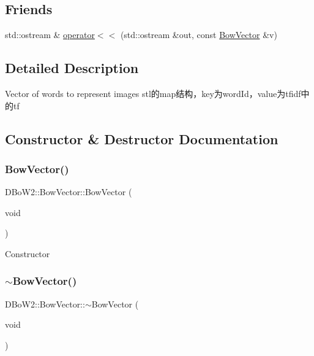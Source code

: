 \subsection*{Friends}
\begin{DoxyCompactItemize}
\item 
std\+::ostream \& \mbox{\hyperlink{class_d_bo_w2_1_1_bow_vector_a1a7d9ac0f9128538859adfea38453ae1}{operator$<$$<$}} (std\+::ostream \&out, const \mbox{\hyperlink{class_d_bo_w2_1_1_bow_vector}{Bow\+Vector}} \&v)
\end{DoxyCompactItemize}


\subsection{Detailed Description}
Vector of words to represent images stl的map结构，key为word\+Id，value为tfidf中的tf 

\subsection{Constructor \& Destructor Documentation}
\mbox{\label{class_d_bo_w2_1_1_bow_vector_ac4da23e700adc4ee083d66b23ce86e90}} 
\subsubsection{\texorpdfstring{Bow\+Vector()}{BowVector()}}
{\footnotesize\ttfamily D\+Bo\+W2\+::\+Bow\+Vector\+::\+Bow\+Vector (\begin{DoxyParamCaption}\item[{void}]{ }\end{DoxyParamCaption})}

Constructor \mbox{\label{class_d_bo_w2_1_1_bow_vector_a7210cac6ce006c7232f4d097faa338d0}} 
\subsubsection{\texorpdfstring{$\sim$\+Bow\+Vector()}{~BowVector()}}
{\footnotesize\ttfamily D\+Bo\+W2\+::\+Bow\+Vector\+::$\sim$\+Bow\+Vector (\begin{DoxyParamCaption}\item[{void}]{ }\end{DoxyParamCaption})}


